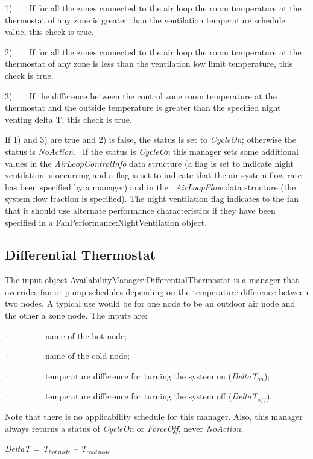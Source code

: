 1)~~~~If for all the zones connected to the air loop the room temperature at the thermostat of any zone is greater than the ventilation temperature schedule value, this check is true.

2)~~~~If for all the zones connected to the air loop the room temperature at the thermostat of any zone is less than the ventilation low limit temperature, this check is true.

3)~~~~If the difference between the control zone room temperature at the thermostat and the outside temperature is greater than the specified night venting delta T, this check is true.

If 1) and 3) are true and 2) is false, the status is set to \emph{CycleOn}; otherwise the status is \emph{NoAction}.~ If the status is \emph{CycleOn} this manager sets some additional values in the \emph{AirLoopControlInfo} data structure (a flag is set to indicate night ventilation is occurring and a flag is set to indicate that the air system flow rate has been specified by a manager) and in the \emph{~AirLoopFlow} data structure (the system flow fraction is specified). The night ventilation flag indicates to the fan that it should use alternate performance characteristics if they have been specified in a FanPerformance:NightVentilation object.

\subsection{Differential Thermostat}\label{differential-thermostat}

The input object AvailabilityManager:DifferentialThermostat is a manager that overrides fan or pump schedules depending on the temperature difference between two nodes. A typical use would be for one node to be an outdoor air node and the other a zone node. The inputs are:

·~~~~~~~~name of the hot node;

·~~~~~~~~name of the cold node;

·~~~~~~~~temperature difference for turning the system on (\emph{DeltaT\(_{on}\)});

·~~~~~~~~temperature difference for turning the system off (\emph{DeltaT\(_{off}\)}).

Note that there is no applicability schedule for this manager. Also, this manager always returns a status of \emph{CycleOn} or \emph{ForceOff}, never \emph{NoAction}.

\emph{DeltaT} = \emph{T\(_{hot\, node}\)} -- \emph{T\(_{cold\, node}\)}

